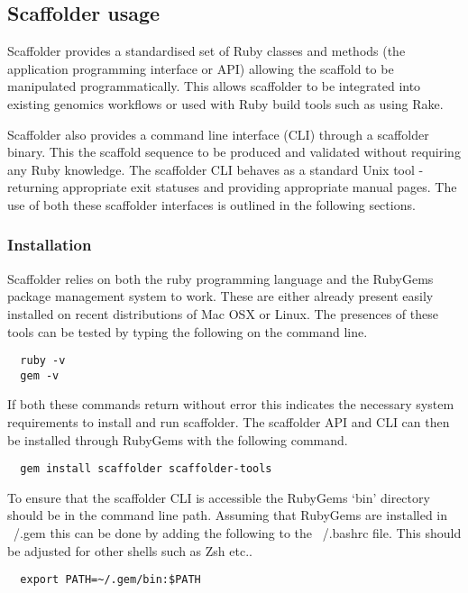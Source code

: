 \documentclass[10pt]{bmc_article}
\newenvironment{bmcformat}{\begin{raggedright}\baselineskip20pt\sloppy\setboolean{publ}{false}}{\end{raggedright}\baselineskip20pt\sloppy}
\begin{document}
\begin{bmcformat}
\subsection*{Scaffolder usage} %

Scaffolder provides a standardised set of Ruby classes and methods (the
application programming interface or API) allowing the scaffold to be
manipulated programmatically. This allows scaffolder to be integrated into
existing genomics workflows or used with Ruby build tools such as using Rake.
\pb

Scaffolder also provides a command line interface (CLI) through a scaffolder
binary. This the scaffold sequence to be produced and validated without
requiring any Ruby knowledge. The scaffolder CLI behaves as a standard Unix
tool - returning appropriate exit statuses and providing appropriate manual
pages. The use of both these scaffolder interfaces is outlined in the following
sections. \pb

\subsubsection*{Installation} %

Scaffolder relies on both the ruby programming language and the RubyGems
package management system to work. These are either already present easily
installed on recent distributions of Mac OSX or Linux. The presences of these
tools can be tested by typing the following on the command line. \pb

\begin{verbatim}
  ruby -v
  gem -v
\end{verbatim}

If both these commands return without error this indicates the necessary
system requirements to install and run scaffolder. The scaffolder API and CLI
can then be installed through RubyGems with the following command.

\begin{verbatim}
  gem install scaffolder scaffolder-tools
\end{verbatim}

To ensure that the scaffolder CLI is accessible the RubyGems `bin' directory
should be in the command line path. Assuming that RubyGems are installed in
~/.gem this can be done by adding the following to the ~/.bashrc file. This
should be adjusted for other shells such as Zsh etc..

\begin{verbatim}
  export PATH=~/.gem/bin:$PATH
\end{verbatim}


\end{bmcformat}
\end{document}
